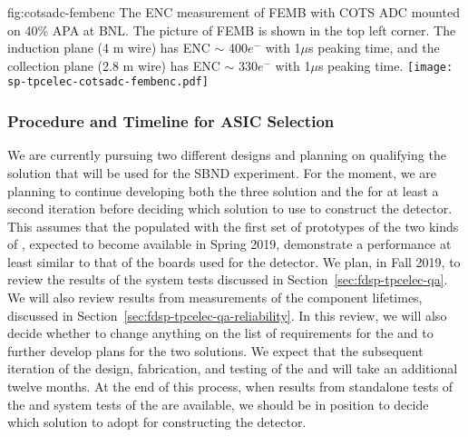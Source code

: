 \begin{dunefigure}
{fig:cotsadc-fembenc}
{The ENC measurement of FEMB with COTS ADC mounted on 40\% APA at BNL. The picture of FEMB is shown in the top left corner. The induction plane (4 m wire) has ENC $\sim$ 400$e^-$ with 1$\mu$s peaking time, and the collection plane (2.8 m wire) has ENC $\sim$ 330$e^-$ with 1$\mu$s peaking time.}
\texttt{[image: sp-tpcelec-cotsadc-fembenc.pdf]}
\end{dunefigure}

\subsubsection{Procedure and Timeline for ASIC Selection}
\label{sec:fdsp-tpcelec-design-femb-selection}

We are currently pursuing two different  designs
and planning on qualifying the   solution that will be used for the SBND experiment.
For the moment, we are planning to continue developing 
both the three  solution and  the  
for at least a second iteration before deciding which  solution to use to construct
the   detector. This assumes that the 
populated with the first set of prototypes of the two kinds of
, expected to become available in Spring 2019,
demonstrate a performance at least similar to that of the
boards used for the  detector. We plan, in Fall 2019, to review the results of the system tests
discussed in Section~\ref{sec:fdsp-tpcelec-qa}. We will also
review results from measurements of the component lifetimes,
discussed in Section~\ref{sec:fdsp-tpcelec-qa-reliability}. In this review,
we will also decide whether to change anything on the list
of requirements for the  and to further develop
plans for the two solutions. We expect that the subsequent iteration
of the design, fabrication, and testing of the  and
 will take an additional twelve months. At
the end of this process, when results from standalone tests of the
 and system tests of the  are
available, we should be in position to decide which 
solution to adopt for constructing the   detector.

